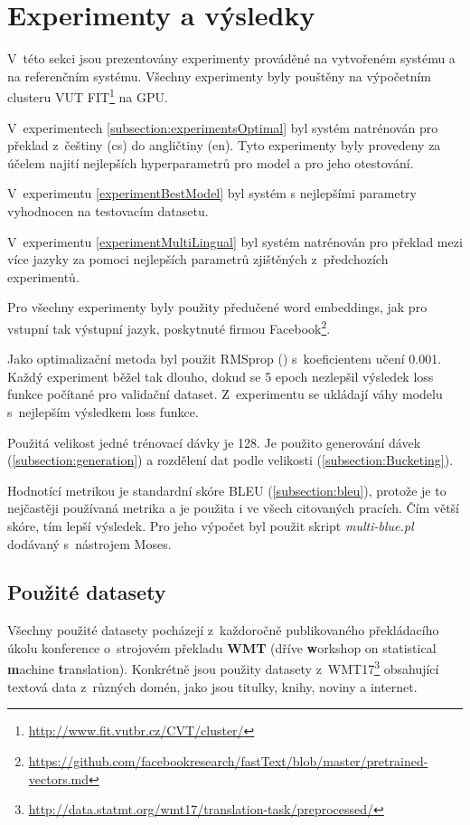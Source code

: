 \chapter{Experimenty a výsledky} \label{chapter:results}
V~této sekci jsou prezentovány experimenty prováděné na vytvořeném systému a na referenčním systému. Všechny experimenty byly pouštěny na výpočetním clusteru VUT FIT\footnote{\url{http://www.fit.vutbr.cz/CVT/cluster/}} na GPU.

V~experimentech \ref{subsection:experimentsOptimal} byl systém natrénován pro překlad z~češtiny (cs) do angličtiny (en). Tyto experimenty byly provedeny za účelem najití nejlepších hyperparametrů pro model a pro jeho otestování.

V~experimentu \ref{experimentBestModel} byl systém s nejlepšími parametry vyhodnocen na testovacím datasetu.

V~experimentu \ref{experimentMultiLingual} byl systém natrénován pro překlad mezi více jazyky za pomoci nejlepších parametrů zjištěných z~předchozích experimentů.

Pro všechny experimenty byly použity předučené word embeddings, jak pro vstupní tak výstupní jazyk, poskytnuté firmou Facebook\footnote{\url{https://github.com/facebookresearch/fastText/blob/master/pretrained-vectors.md}}.

Jako optimalizační metoda byl použit RMSprop (\cite{gradientDescent}) s~koeficientem učení 0.001. Každý experiment běžel tak dlouho, dokud se 5 epoch nezlepšil výsledek loss funkce počítané pro validační dataset. Z~experimentu se ukládají váhy modelu s~nejlepším výsledkem loss funkce.

Použitá velikost jedné trénovací dávky je 128. Je použito generování dávek (\ref{subsection:generation}) a rozdělení dat podle velikosti (\ref{subsection:Bucketing}).

Hodnotící metrikou je standardní skóre BLEU (\ref{subsection:bleu}), protože je to nejčastěji používaná metrika a je použita i ve všech citovaných pracích. Čím větší skóre, tím lepší výsledek. Pro jeho výpočet byl použit skript \emph{multi-blue.pl} dodávaný s~nástrojem Moses.


\section{Použité datasety}
Všechny použité datasety pocházejí z~každoročně publikovaného překládacího úkolu konference o~strojovém překladu \textbf{WMT} (dříve \textbf{w}orkshop on statistical \textbf{m}achine \textbf{t}ranslation). Konkrétně jsou použity datasety z~WMT17\footnote{\url{http://data.statmt.org/wmt17/translation-task/preprocessed/}} obsahující textová data z~různých domén, jako jsou titulky, knihy, noviny a internet.

